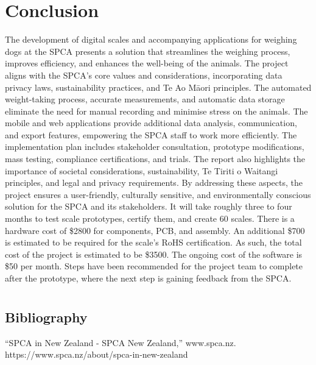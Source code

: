 
\chapter{Conclusion}

The development of digital scales and accompanying applications for weighing dogs at the SPCA presents a solution that streamlines the weighing process, improves efficiency, and enhances the well-being of the animals. The project aligns with the SPCA's core values and considerations, incorporating data privacy laws, sustainability practices, and Te Ao Māori principles. The automated weight-taking process, accurate measurements, and automatic data storage eliminate the need for manual recording and minimise stress on the animals. The mobile and web applications provide additional data analysis, communication, and export features, empowering the SPCA staff to work more efficiently. The implementation plan includes stakeholder consultation, prototype modifications, mass testing, compliance certifications, and trials. The report also highlights the importance of societal considerations, sustainability, Te Tiriti o Waitangi principles, and legal and privacy requirements. By addressing these aspects, the project ensures a user-friendly, culturally sensitive, and environmentally conscious solution for the SPCA and its stakeholders. It will take roughly three to four months to test scale prototypes, certify them, and create 60 scales. There is a hardware cost of \$2800 for components, PCB, and assembly. An additional \$700 is estimated to be required for the scale's RoHS certification. As such, the total cost of the project is estimated to be \$3500. The ongoing cost of the software is \$50 per month. Steps have been recommended for the project team to complete after the prototype, where the next step is gaining feedback from the SPCA.

\chapter{}
\section{Bibliography}

“SPCA in New Zealand - SPCA New Zealand,” www.spca.nz. https://www.spca.nz/about/spca-in-new-zealand

